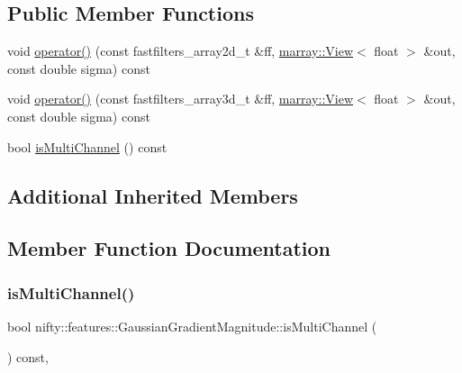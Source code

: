\subsection*{Public Member Functions}
\begin{DoxyCompactItemize}
\item 
void \hyperlink{structnifty_1_1features_1_1GaussianGradientMagnitude_a00efc1c411b58f0e212b26e3a4b9c06c}{operator()} (const fastfilters\+\_\+array2d\+\_\+t \&ff, \hyperlink{classandres_1_1View}{marray\+::\+View}$<$ float $>$ \&out, const double sigma) const
\item 
void \hyperlink{structnifty_1_1features_1_1GaussianGradientMagnitude_a0c442cf0666188ae0dcea15adfa725b8}{operator()} (const fastfilters\+\_\+array3d\+\_\+t \&ff, \hyperlink{classandres_1_1View}{marray\+::\+View}$<$ float $>$ \&out, const double sigma) const
\item 
bool \hyperlink{structnifty_1_1features_1_1GaussianGradientMagnitude_ab586b1dd5bd966f8622105fafb3029c8}{is\+Multi\+Channel} () const
\end{DoxyCompactItemize}
\subsection*{Additional Inherited Members}


\subsection{Member Function Documentation}
\mbox{\label{structnifty_1_1features_1_1GaussianGradientMagnitude_ab586b1dd5bd966f8622105fafb3029c8}} 
\subsubsection{\texorpdfstring{is\+Multi\+Channel()}{isMultiChannel()}}
{\footnotesize\ttfamily bool nifty\+::features\+::\+Gaussian\+Gradient\+Magnitude\+::is\+Multi\+Channel (\begin{DoxyParamCaption}{ }\end{DoxyParamCaption}) const\hspace{0.3cm}{\ttfamily [inline]}, {\ttfamily [virtual]}}



